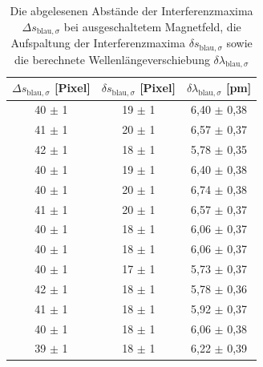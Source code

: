               \begin{table}[h]
                \centering
                \caption{Die abgelesenen Abstände der Interferenzmaxima $\Delta s_{\text{blau}, \sigma}$ bei ausgeschaltetem Magnetfeld, die Aufspaltung der Interferenzmaxima $\delta s_{\text{blau}, \sigma}$ sowie die berechnete Wellenlängeverschiebung $\delta \lambda_{\text{blau}, \sigma}$}
                \label{tab:blau_sigma}
              
                \begin{tabular}{c c c}
                  \toprule
                  {$\Delta s_{\text{blau}, \sigma}$ [Pixel]} & {$\delta s_{\text{blau}, \sigma}$ [Pixel]} & {$\delta \lambda_{\text{blau}, \sigma}$ [\si{\pico\metre}]} \\ 
                  \midrule
                   40 $\pm$ 1  &   19 $\pm$ 1   &   6,40 $\pm$ 0,38   \\
                   41 $\pm$ 1  &   20 $\pm$ 1   &   6,57 $\pm$ 0,37   \\
                   42 $\pm$ 1  &   18 $\pm$ 1   &   5,78 $\pm$ 0,35   \\
                   40 $\pm$ 1  &   19 $\pm$ 1   &   6,40 $\pm$ 0,38   \\
                   40 $\pm$ 1  &   20 $\pm$ 1   &   6,74 $\pm$ 0,38   \\
                   41 $\pm$ 1  &   20 $\pm$ 1   &   6,57 $\pm$ 0,37   \\
                   40 $\pm$ 1  &   18 $\pm$ 1   &   6,06 $\pm$ 0,37   \\
                   40 $\pm$ 1  &   18 $\pm$ 1   &   6,06 $\pm$ 0,37   \\
                   40 $\pm$ 1  &   17 $\pm$ 1   &   5,73 $\pm$ 0,37   \\
                   42 $\pm$ 1  &   18 $\pm$ 1   &   5,78 $\pm$ 0,36   \\
                   41 $\pm$ 1  &   18 $\pm$ 1   &   5,92 $\pm$ 0,37   \\
                   40 $\pm$ 1  &   18 $\pm$ 1   &   6,06 $\pm$ 0,38   \\
                   39 $\pm$ 1  &   18 $\pm$ 1   &   6,22 $\pm$ 0,39   \\

                  \bottomrule
                \end{tabular}
              \end{table}
              \FloatBarrier
            
            
